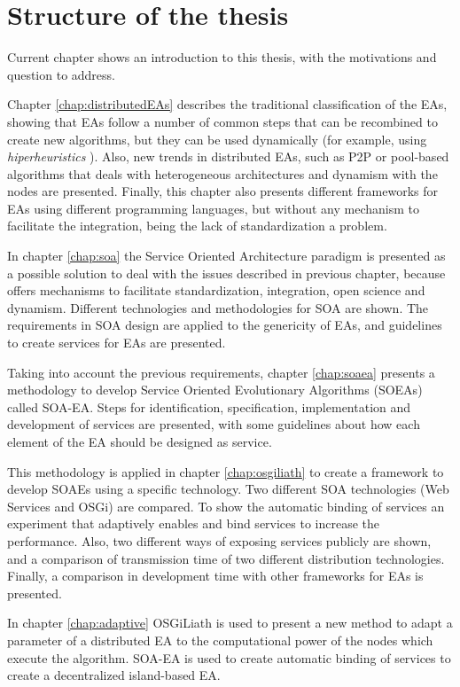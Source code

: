 \section{Structure of the thesis}
\label{sec:intro:structure}

Current chapter shows an introduction to this thesis, with the motivations and question to address. 

Chapter \ref{chap:distributedEAs} describes the traditional classification of the EAs, showing that EAs follow a number of common steps that can be recombined to create new algorithms, but they can be used dynamically (for example, using {\em hiperheuristics} \cite{cowling2001hyperheuristic}). Also, new trends in distributed EAs, such as P2P or pool-based algorithms that deals with heterogeneous architectures and dynamism with the nodes are presented. Finally, this chapter also presents different frameworks for EAs using different programming languages, but without any mechanism to facilitate the integration, being the lack of standardization a problem.

In chapter \ref{chap:soa} the Service Oriented Architecture paradigm is presented as a possible solution to deal with the issues described in previous chapter, because offers mechanisms to facilitate standardization, integration, open science and dynamism. Different technologies and methodologies for SOA are shown. The requirements in SOA design are applied to the genericity of EAs, and guidelines to create services for EAs are presented.

Taking into account the previous requirements, chapter \ref{chap:soaea} presents a methodology to develop Service Oriented Evolutionary Algorithms (SOEAs) called SOA-EA. Steps for identification, specification, implementation and development of services are presented, with some guidelines about how each element of the EA should be designed as service.

This methodology is applied in chapter \ref{chap:osgiliath} to create a framework to develop SOAEs using a specific technology. Two different SOA technologies (Web Services and OSGi) are compared. To show the automatic binding of services an experiment that adaptively enables and bind services to increase the performance. Also, two different ways of exposing services publicly are shown, and a comparison of transmission time of two different distribution technologies. Finally, a comparison in development time with other frameworks for EAs is presented.

In chapter \ref{chap:adaptive} OSGiLiath is used to present a new method to adapt a parameter of a distributed EA to the computational power of the nodes which execute the algorithm. SOA-EA is used to create automatic binding of services to create a decentralized island-based EA.

